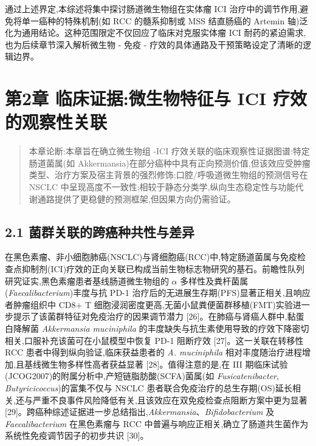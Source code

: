 \documentclass[11pt]{article}
\begin{document}
通过上述界定,本综述将集中探讨肠道微生物组在实体瘤 ICI 治疗中的调节作用,避免将单一癌种的特殊机制(如 RCC 的髓系抑制或 MSS 结直肠癌的 Artemin 轴)泛化为通用结论。这种范围限定不仅回应了临床对克服实体瘤 ICI 耐药的紧迫需求,也为后续章节深入解析微生物 - 免疫 - 疗效的具体通路及干预策略设定了清晰的逻辑边界。

\section{第2章 临床证据:微生物特征与 ICI 疗效的观察性关联}\label{ux7b2c2ux7ae0-ux4e34ux5e8aux8bc1ux636eux5faeux751fux7269ux7279ux5f81ux4e0e-ici-ux7597ux6548ux7684ux89c2ux5bdfux6027ux5173ux8054}

\begin{quote}
本章论断:本章旨在确立微生物组 -ICI 疗效关联的临床观察性证据图谱:特定肠道菌属(如 Akkermansia)在部分癌种中具有正向预测价值,但该效应受肿瘤类型、治疗方案及宿主背景的强烈修饰;口腔/呼吸道微生物组的预测信号在 NSCLC 中呈现高度不一致性;相较于静态分类学,纵向生态稳定性与功能代谢通路提供了更稳健的预测框架,但因果方向仍需验证。
\end{quote}

\subsection{2.1 菌群关联的跨癌种共性与差异}\label{ux83ccux7fa4ux5173ux8054ux7684ux8de8ux764cux79cdux5171ux6027ux4e0eux5deeux5f02}

在黑色素瘤、非小细胞肺癌(NSCLC)与肾细胞癌(RCC)中,特定肠道菌属与免疫检查点抑制剂(ICI)疗效的正向关联已构成当前生物标志物研究的基石。前瞻性队列研究证实,黑色素瘤患者基线肠道微生物组的 \(\alpha\) 多样性及粪杆菌属(\emph{Faecalibacterium})丰度与抗 PD-1 治疗后的无进展生存期(PFS)显著正相关,且响应者肿瘤组织中 CD8+ T 细胞浸润密度更高,无菌小鼠粪便菌群移植(FMT)实验进一步提示了该菌群特征对免疫治疗的因果调节潜力 {[}26{]}。在肺癌与肾癌人群中,黏蛋白降解菌 \emph{Akkermansia muciniphila} 的丰度缺失与抗生素使用导致的疗效下降密切相关,口服补充该菌可在小鼠模型中恢复 PD-1 阻断疗效 {[}27{]}。这一关联在转移性 RCC 患者中得到纵向验证,临床获益患者的 \emph{A. muciniphila} 相对丰度随治疗进程增加,且基线微生物多样性高者获益显著 {[}28{]}。值得注意的是,在 III 期临床试验(JCOG2007)的附属分析中,产短链脂肪酸(SCFA)菌属(如 \emph{Fusicatenibacter}, \emph{Butyricicoccus})的富集不仅与 NSCLC 患者联合免疫治疗的总生存期(OS)延长相关,还与严重不良事件风险降低有关,且该效应在双免疫检查点阻断方案中更为显著 {[}29{]}。跨癌种综述证据进一步总结指出,\emph{Akkermansia}、\emph{Bifidobacterium} 及 \emph{Faecalibacterium} 在黑色素瘤与 RCC 中普遍与响应正相关,确立了肠道共生菌作为系统性免疫调节因子的初步共识 {[}30{]}。
\end{document}
